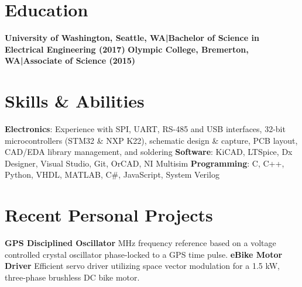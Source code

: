 \documentclass[]{article}
\begin{document}
\begin{singlespace}
\section*{Education}


\textbf{University of Washington, Seattle, WA\hspace{3 mm}|\hspace{3 mm}Bachelor of Science in Electrical Engineering (2017)}
\vspace{-3mm}
\newline\break\textbf{Olympic College, Bremerton, WA\hspace{3 mm}|\hspace{3 mm}Associate of Science (2015)}


\section*{Skills \& Abilities}


\textbf{Electronics}: Experience with SPI, UART, RS-485 and USB interfaces, 32-bit microcontrollers (STM32 \& NXP K22), schematic design \& capture, 
PCB layout, CAD/EDA library management, and soldering 
\newline\textbf{Software}: KiCAD, LTSpice, Dx Designer, Visual Studio, Git, OrCAD, NI Multisim
\newline\textbf{Programming}: C, C++, Python, VHDL, MATLAB, C\#, JavaScript, System Verilog


\section*{Recent Personal Projects}


\textbf{GPS Disciplined Oscillator} MHz frequency reference based on a voltage controlled crystal oscillator phase-locked to a GPS time pulse.
\textbf{eBike Motor Driver}\newline
Efficient servo driver utilizing space vector modulation for a 1.5 kW, three-phase brushless DC bike motor.


\end{singlespace}
\end{document}
